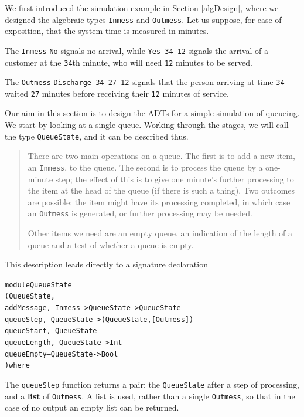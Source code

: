 \label{simEx}

We first introduced the simulation example in Section \ref{algDesign}, where
we designed the algebraic types \texttt{Inmess} and \texttt{Outmess}. Let us
suppose, for ease of exposition, that the system time is measured in minutes.

The 
\texttt{Inmess} \texttt{No} signals no arrival, while \texttt{Yes 34 12} signals the
arrival of a customer at the \texttt{34}th minute, who will need \texttt{12} minutes
to be served. 

The \texttt{Outmess} \texttt{Discharge 34 27 12} signals that the person arriving
at time \texttt{34} waited \texttt{27} minutes before receiving their \texttt{12}
minutes of service.

Our aim in this section is to design the ADTs for a simple
simulation of queueing. We start by looking at a single queue. Working
through the stages, we will call the type \texttt{QueueState}, and it can be
described thus. 
\begin{quote}
There are two main operations on a queue. The first is to add a new item, an
\texttt{Inmess}, to the queue. The second is to process the queue by a one-minute
step; the effect of this is to give one minute's further processing to the
item at the head of the queue (if there is such a thing). Two outcomes are
possible: the item might have its processing completed, in which case an 
\texttt{Outmess} is generated, or further processing may be needed.

Other items we need are an empty queue, an indication of
the length of a queue and a test of whether a queue is empty.
\end{quote}
This description leads directly to a signature declaration
\begin{alltt}
module QueueState 
  ( QueueState ,
    addMessage,      -- Inmess -> QueueState -> QueueState
    queueStep,       -- QueueState -> ( QueueState , [Outmess] )
    queueStart,      -- QueueState
    queueLength,     -- QueueState -> Int
    queueEmpty       -- QueueState -> Bool
    ) where
\end{alltt}
The \texttt{queueStep} function returns a pair: the \texttt{QueueState}
after a step of
processing, and a \textbf{list} of \texttt{Outmess}. A list is used, rather
than a single \texttt{Outmess}, so that in the case of no output an empty list
can be returned.

